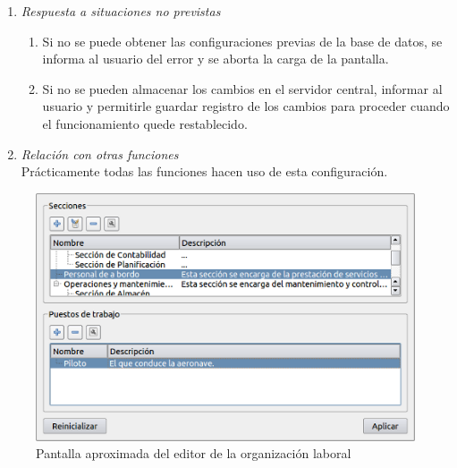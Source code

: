 \begin{enumerate}
\begin{enumerate}
			\end{enumerate}
		\item \textit{Respuesta a situaciones no previstas}
			\begin{enumerate}
				\item Si no se puede obtener las configuraciones previas de la base de datos, se informa al usuario del error y se aborta la carga de la pantalla.
				\item Si no se pueden almacenar los cambios en el servidor central, informar al usuario y permitirle guardar registro de los cambios para proceder cuando el funcionamiento quede restablecido.
			\end{enumerate}
		\item \textit{Relación con otras funciones}\\
			Prácticamente todas las funciones hacen uso de esta configuración.
	\end{enumerate}

\begin{figure}[ht]\centering
	\includegraphics[scale=.6]{imagenes/OrgLaboral.png}
	\caption{Pantalla aproximada del editor de la organización laboral}
\end{figure}

